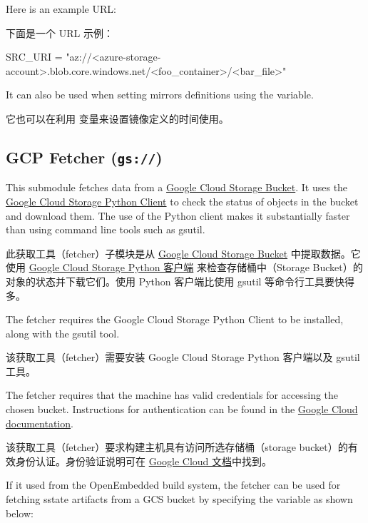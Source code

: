 Here is an example URL:

下面是一个 URL 示例：

\begin{pyglist}
SRC_URI = "az://<azure-storage-account>.blob.core.windows.net/<foo_container>/<bar_file>"
\end{pyglist}

It can also be used when setting mirrors definitions using the  variable.

它也可以在利用  变量来设置镜像定义的时间使用。

\subsection{GCP Fetcher (\texttt{gs://})}

This submodule fetches data from a \href{https://cloud.google.com/storage/docs/buckets}{Google Cloud Storage Bucket}. It uses the \href{https://cloud.google.com/python/docs/reference/storage/latest}{Google Cloud Storage Python Client} to check the status of objects in the bucket and download them. The use of the Python client makes it substantially faster than using command line tools such as gsutil.

此获取工具（fetcher）子模块是从 \href{https://cloud.google.com/storage/docs/buckets}{Google Cloud Storage Bucket} 中提取数据。它使用 \href{https://cloud.google.com/python/docs/reference/storage/latest}{Google Cloud Storage Python 客户端} 来检查存储桶中（Storage Bucket）的对象的状态并下载它们。使用 Python 客户端比使用 gsutil 等命令行工具要快得多。

The fetcher requires the Google Cloud Storage Python Client to be installed, along with the gsutil tool.

该获取工具（fetcher）需要安装 Google Cloud Storage Python 客户端以及 gsutil 工具。

The fetcher requires that the machine has valid credentials for accessing the chosen bucket. Instructions for authentication can be found in the \href{https://cloud.google.com/docs/authentication/provide-credentials-adc#local-dev}{Google Cloud documentation}.

该获取工具（fetcher）要求构建主机具有访问所选存储桶（storage bucket）的有效身份认证。身份验证说明可在 \href{https://cloud.google.com/docs/authentication/provide-credentials-adc#local-dev}{Google Cloud 文档}中找到。

If it used from the OpenEmbedded build system, the fetcher can be used for fetching sstate artifacts from a GCS bucket by specifying the  variable as shown below:

